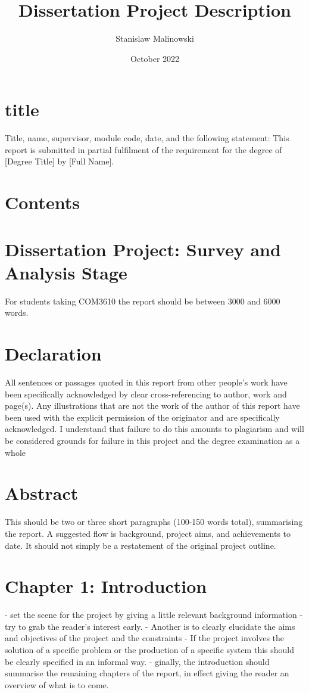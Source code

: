 \documentclass{article}
\title{Dissertation Project Description}
\author{Stanislaw Malinowski}
\date{October 2022}
\begin{document}
\maketitle
\section{title}
Title, name, supervisor, module code, date,
and the following statement: This report is submitted in partial fulfilment of the requirement for the degree of [Degree Title] by [Full Name].

\section*{Contents}
\tableofcontents
\newpage

\section{Dissertation Project: Survey and Analysis Stage}

For students taking COM3610 the report should be between 3000 and 6000 words.
\section{Declaration}
All sentences or passages quoted in this report from other people's work have been specifically acknowledged by clear cross-referencing to author, work and page(s). Any illustrations that are not the work of the author of this report have been used with the explicit permission of the originator and are specifically acknowledged. I understand that failure to do this amounts to plagiarism and will be considered grounds for failure in this project and the degree examination as a whole

\newpage

\section{Abstract}

This should be two or three short paragraphs (100-150 words total), summarising the report.
A suggested flow is background, project aims, and achievements to date. It should not simply be a restatement of the original project outline.

\section{Chapter 1: Introduction}
- set the scene for the project by giving a little relevant background information - try to grab the reader's interest early.
-  Another is to clearly elucidate the aims and objectives of the project and the constraints 
- If the project involves the solution of a specific problem or the production of a specific system this should be clearly specified in an informal way.
- ginally, the introduction should summarise the remaining chapters of the report, in effect giving the reader an overview of what is to come.
\end{document}
